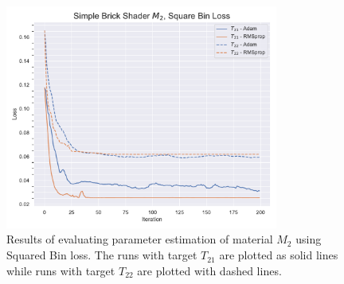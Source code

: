 \begin{figure}
    \centering
    \includegraphics[width=0.8\textwidth]{img/evaluation/M2/SBS_SBL.pdf}
    \caption{Results of evaluating parameter estimation of material $M_2$ using Squared Bin loss. The runs with target $T_{21}$ are plotted as solid lines while runs with target $T_{22}$ are plotted with dashed lines.}
    \label{fig:M2SBLData}
\end{figure}

